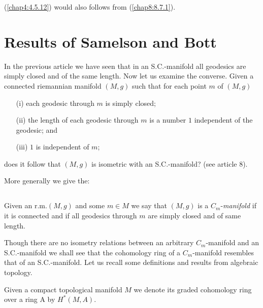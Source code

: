 \begin{remark*}
(\ref{chap4:4.5.12}) would also follows from (\ref{chap8:8.7.1}).
\end{remark*}

\section{Results of Samelson and Bott}\label{chap4:sec6}

\quad
In the previous article we have seen that in an S.C.-manifold all
geo\-desics are simply closed and of the same length. Now let us examine
the converse. Given a connected riemannian manifold $(M,g)$ such that
for each point $m$ of $(M,g)$
\begin{itemize}
\item[(i)] each \pageoriginale geodesic through $m$ is simply closed;

\item[(ii)] the length of each geodesic through $m$ is a number $1$
  independent of the geodesic; and

\item[(iii)] $1$ is independent of $m$;
\end{itemize}
does it follow that $(M,g)$ is isometric with an S.C.-manifold? (see
article 8).

More generally we give the:

\subsection{}\label{chap4:defi4.6.1}

\begin{defi*}
Given an r.m.\@ $(M,g)$ and some $m\in M$ we say that $(M,g)$ is a
$C_{m}$-{\em manifold} if it is connected and if all geodesics through
$m$ are simply closed and of same length.
\end{defi*}

Though there are no isometry relations between an arbitrary
$C_{m}$-manifold and an S.C.-manifold we shall see that the cohomology
ring of a $C_{m}$-manifold resembles that of an S.C.-manifold. Let us
recall some definitions and results from algebraic topology.

Given a compact topological manifold $M$ we denote its graded
cohomology ring over a ring A by $H^{\ast}(M,A)$.

\subsection{}\label{chap4:4.6.2}

